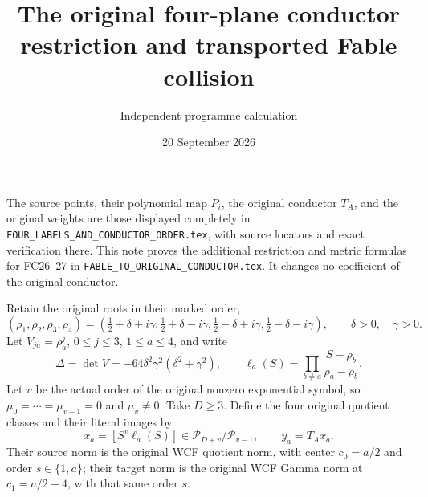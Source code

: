 \documentclass[11pt]{article}
\title{The original four-plane conductor restriction and transported Fable collision}
\author{Independent programme calculation}
\date{20 September 2026}
\newcommand{\cP}{\mathcal P}
\begin{document}
\maketitle
The source points, their polynomial map $P_i$, the original conductor
$T_A$, and the original weights are those displayed completely in
\texttt{FOUR\_LABELS\_AND\_CONDUCTOR\_ORDER.tex}, with source
locators and exact verification there. This note proves the additional
restriction and metric formulas for FC26--27 in
\texttt{FABLE\_TO\_ORIGINAL\_CONDUCTOR.tex}. It changes no
coefficient of the original conductor.

Retain the original roots in their marked order,
\[
 (\rho_1,\rho_2,\rho_3,\rho_4)
 =(\tfrac12+\delta+i\gamma,\tfrac12+\delta-i\gamma,
 \tfrac12-\delta+i\gamma,\tfrac12-\delta-i\gamma),
 \qquad \delta>0,\quad\gamma>0.
\]
Let $V_{ja}=\rho_a^j$, $0\le j\le3$, $1\le a\le4$, and write
\[
 \Delta=\det V=-64\delta^2\gamma^2(\delta^2+\gamma^2),\qquad
 \ell_a(S)=\prod_{b\ne a}\frac{S-\rho_b}{\rho_a-\rho_b}.
\]
Let $v$ be the actual order of the original nonzero exponential
symbol, so $\mu_0=\cdots=\mu_{v-1}=0$ and $\mu_v\ne0$.
Take $D\ge3$. Define the four original quotient classes and their
literal images by
\[
 x_a=[S^v\ell_a(S)]\in\cP_{D+v}/\cP_{v-1},\qquad
 y_a=T_Ax_a.
\]
Their source norm is the original WCF quotient norm, with center
$c_0=a/2$ and order $s\in\{1,a\}$; their target norm is the original
WCF Gamma norm at $c_1=a/2-4$, with that same order $s$.
\end{document}
